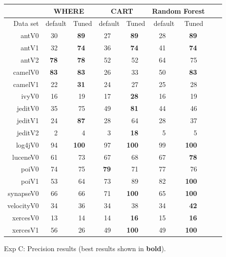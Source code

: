 \documentclass{acm_proc_article-sp}
\begin{document}
\begin{figure}[!b]
\renewcommand{\baselinestretch}{0.8} 
\newcommand{\rone}{}
\newcommand{\rtwo}{}
\newcommand{\rthree}{}
\newcommand{\rfour}{} 
\newcommand{\rfive}{}
\scriptsize    

\begin{tabular}{r|rl|rl|rl|rl|rl|rlrl}
      &   \multicolumn{4}{c|}{WHERE}         &   \multicolumn{4}{c|}{CART}         &   \multicolumn{4}{c}{Random Forest}         \\\hline
  Data set   &   \multicolumn{2}{c}{default}         &   \multicolumn{2}{c|}{Tuned}         &   \multicolumn{2}{c}{default}         &   \multicolumn{2}{c|}{Tuned}    &   \multicolumn{2}{c}{default}  &   \multicolumn{2}{c}{Tuned}\\\hline
antV0 & 30 &   & {\bf 89} &   & 27 &   & {\bf 89} &   & 28 &   & {\bf 89} &  \\
antV1 & 32 &   & {\bf 74} &   & 36 &   & {\bf 74} &   & 41 &   & {\bf 74} &  \\
antV2 & {\bf 78} &   & {\bf 78} &   & 52 &   & 52 &   & 64 &   & 75 &  \\
camelV0 & {\bf 83} &   & {\bf 83} &   & 26 &   & 33 &   & 50 &   & {\bf 83} &  \\
camelV1 & 22 &   & {\bf 31} &   & 24 &   & 27 &   & 25 &   & 28 &  \\
ivyV0 & 16 &   & 19 &   & 17 &   & {\bf 28} &   & 16 &   & 19 &  \\
jeditV0 & 35 &   & 75 &   & 49 &   & {\bf 81} &   & 44 &   & 46 &  \\
jeditV1 & 24 &   & {\bf 87} &   & 28 &   & 64 &   & 28 &   & 37 &  \\
jeditV2 & 2 &   & 4 &   & 3 &   & {\bf 18} &   & 5 &   & 5 &  \\
log4jV0 & 94 &   & {\bf 100} &   & 97 &   & {\bf 100} &   & 99 &   & {\bf 100} &  \\
luceneV0 & 61 &   & 73 &   & 67 &   & 68 &   & 67 &   & {\bf 78} &  \\
poiV0 & 74 &   & 75 &   & {\bf 79} &   & 71 &   & 77 &   & 76 &  \\
poiV1 & 53 &   & 64 &   & 73 &   & 89 &   & 82 &   & {\bf 100} &  \\
synapseV0 & 66 &   & 66 &   & 71 &   & {\bf 100} &   & 65 &   & {\bf 100} &  \\
velocityV0 & 34 &   & 36 &   & 34 &   & 38 &   & 34 &   & {\bf 42} &  \\
xercesV0 & 13 &   & 14 &   & 14 &   & {\bf 16} &   & 15 &   & {\bf 16} &  \\
xercesV1 & 56 &   & 26 &   & 49 &   & {\bf 100} &   & 49 &   & {\bf 100} &  \\



\end{tabular}
\caption{ Exp C: Precision results (best results  shown in {\bf bold}).}
\label{fig:precisionbars}
\end{figure}
\end{document}

